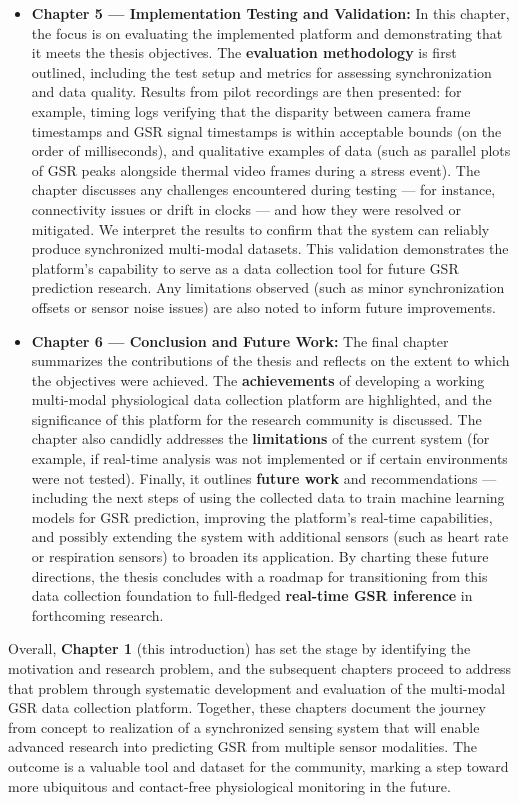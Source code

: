 \begin{itemize}
\item \textbf{Chapter 5 --- Implementation Testing and Validation:} In this
  chapter, the focus is on evaluating the implemented platform and
  demonstrating that it meets the thesis objectives. The \textbf{evaluation
  methodology} is first outlined, including the test setup and metrics
  for assessing synchronization and data quality. Results from pilot
  recordings are then presented: for example, timing logs verifying that
  the disparity between camera frame timestamps and GSR signal
  timestamps is within acceptable bounds (on the order of milliseconds),
  and qualitative examples of data (such as parallel plots of GSR peaks
  alongside thermal video frames during a stress event). The chapter
  discusses any challenges encountered during testing --- for instance,
  connectivity issues or drift in clocks --- and how they were resolved
  or mitigated. We interpret the results to confirm that the system can
  reliably produce synchronized multi-modal datasets. This validation
  demonstrates the platform's capability to serve as a data collection
  tool for future GSR prediction research. Any limitations observed
  (such as minor synchronization offsets or sensor noise issues) are
  also noted to inform future improvements.

\item \textbf{Chapter 6 --- Conclusion and Future Work:} The final chapter
  summarizes the contributions of the thesis and reflects on the extent
  to which the objectives were achieved. The \textbf{achievements} of
  developing a working multi-modal physiological data collection
  platform are highlighted, and the significance of this platform for
  the research community is discussed. The chapter also candidly
  addresses the \textbf{limitations} of the current system (for example, if
  real-time analysis was not implemented or if certain environments were
  not tested). Finally, it outlines \textbf{future work} and recommendations
  --- including the next steps of using the collected data to train
  machine learning models for GSR prediction, improving the platform's
  real-time capabilities, and possibly extending the system with
  additional sensors (such as heart rate or respiration sensors) to
  broaden its application. By charting these future directions, the
  thesis concludes with a roadmap for transitioning from this data
  collection foundation to full-fledged \textbf{real-time GSR inference} in
  forthcoming research.

\end{itemize}
Overall, \textbf{Chapter 1} (this introduction) has set the stage by
identifying the motivation and research problem, and the subsequent
chapters proceed to address that problem through systematic development
and evaluation of the multi-modal GSR data collection platform.
Together, these chapters document the journey from concept to
realization of a synchronized sensing system that will enable advanced
research into predicting GSR from multiple sensor modalities. The
outcome is a valuable tool and dataset for the community, marking a step
toward more ubiquitous and contact-free physiological monitoring in the
future.

